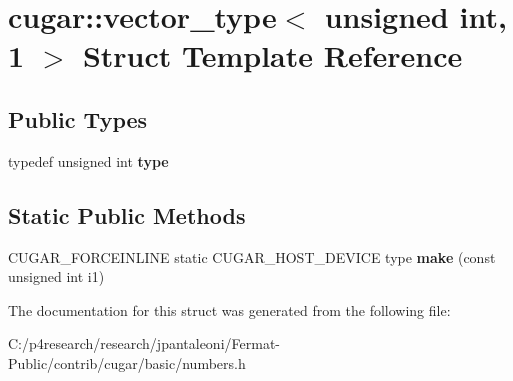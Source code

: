 \hypertarget{structcugar_1_1vector__type_3_01unsigned_01int_00_011_01_4}{}\section{cugar\+:\+:vector\+\_\+type$<$ unsigned int, 1 $>$ Struct Template Reference}
\label{structcugar_1_1vector__type_3_01unsigned_01int_00_011_01_4}
\subsection*{Public Types}
\begin{DoxyCompactItemize}
\item 
\mbox{\label{structcugar_1_1vector__type_3_01unsigned_01int_00_011_01_4_acf1e970f36f25449430f9c32104228c5}} 
typedef unsigned int {\bfseries type}
\end{DoxyCompactItemize}
\subsection*{Static Public Methods}
\begin{DoxyCompactItemize}
\item 
\mbox{\label{structcugar_1_1vector__type_3_01unsigned_01int_00_011_01_4_a12cdef0b4dcd86b6a7d3dbddf1ec5d57}} 
C\+U\+G\+A\+R\+\_\+\+F\+O\+R\+C\+E\+I\+N\+L\+I\+NE static C\+U\+G\+A\+R\+\_\+\+H\+O\+S\+T\+\_\+\+D\+E\+V\+I\+CE type {\bfseries make} (const unsigned int i1)
\end{DoxyCompactItemize}


The documentation for this struct was generated from the following file\+:\begin{DoxyCompactItemize}
\item 
C\+:/p4research/research/jpantaleoni/\+Fermat-\/\+Public/contrib/cugar/basic/numbers.\+h\end{DoxyCompactItemize}
